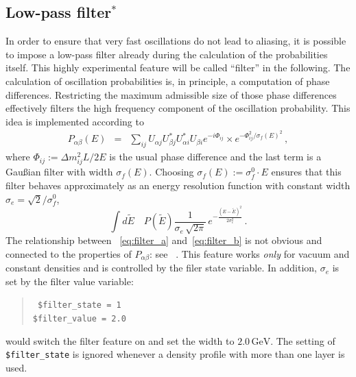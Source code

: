 \subsection{Low-pass filter$^*$}

In order to ensure that very fast oscillations do not lead to 
aliasing,
it is possible to impose a low-pass filter already during the calculation
of the probabilities itself. This highly
experimental feature will be called ``filter'' in the following. 
The calculation of oscillation
probabilities is, in principle, a computation of phase differences. Restricting the maximum admissible size of those phase differences effectively filters
the high frequency component of the oscillation probability. This idea is
implemented according to
\begin{eqnarray}
\label{eq:filter_a}
P_{\alpha\beta}(E)&=&\sum_{ij}
U_{\alpha j} U^*_{\beta j} U^*_{\alpha i} U_{\beta i} 
e^{-i\Phi_{ij}}\times 
e^{ -\Phi_{ij}^2/\sigma_f(E)^2 }\,,
\end{eqnarray}
where $\Phi_{ij}:=\Delta m_{ij}^2 L/2E$ is the usual phase difference and
the last term is a Gau\ss ian filter with width $\sigma_f(E)$. Choosing
$\sigma_f(E):=\sigma_f^0 \cdot E$ ensures that this filter behaves 
approximately as an energy resolution function with constant width 
$\sigma_e=\sqrt{2}/\sigma_f^0$, \ie\
\begin{equation}
\label{eq:filter_b}
\int d\tilde E\quad P(\tilde E) \frac{1}{\sigma_e\,\sqrt{2\pi}}\,
e^{-\frac{(E-\tilde E)^2}{2\sigma^2_e}}\,.
\end{equation}
The relationship between \eqs~\eqref{eq:filter_a} and~\eqref{eq:filter_b}
is not obvious and connected to the properties of $P_{\alpha\beta}$: 
see \Refs~\cite{Kiers:1996zj,Giunti:2003ax}. This feature works \emph{only} 
for vacuum and constant densities and is controlled
by the filer state variable. In addition, $\sigma_e$ is set by the filter value variable:
\index{aedl}{filter state@{\tt \$filter\_state}}
\begin{quote}
{\tt
\$filter\_state = 1\\
\$filter\_value = 2.0\\
}
\end{quote}
would switch the filter feature on and set the width to $2.0\,\mathrm{GeV}$.
The setting of {\tt \$filter\_state} is ignored whenever a density profile
with more than one layer is used. 

